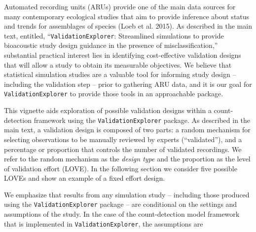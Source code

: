 \documentclass[
]{article}
\begin{document}
Automated recording units (ARUs) provide one of the main data sources for many contemporary ecological studies that aim to provide inference about status and trends for assemblages of species (Loeb et al. 2015). As described in the main text, entitled, ``\texttt{ValidationExplorer}: Streamlined simulations to provide bioacoustic study design guidance in the presence of misclassification,'' substantial practical interest lies in identifying cost-effective validation designs that will allow a study to obtain its measurable objectives. We believe that statistical simulation studies are a valuable tool for informing study design -- including the validation step -- prior to gathering ARU data, and it is our goal for \texttt{ValidationExplorer} to provide those tools in an approachable package.

This vignette aids exploration of possible validation designs within a count-detection framework using the \texttt{ValidationExplorer} package. As described in the main text, a validation design is composed of two parts: a random mechanism for selecting observations to be manually reviewed by experts (``validated''), and a percentage or proportion that controls the number of validated recordings. We refer to the random mechanism as the \emph{design type} and the proportion as the level of validation effort (LOVE). In the following section we consider five possible LOVEs and show an example of a fixed effort design.

We emphasize that results from any simulation study -- including those produced using the \texttt{ValidationExplorer} package -- are conditional on the settings and assumptions of the study. In the case of the count-detection model framework that is implemented in \texttt{ValidationExplorer}, the assumptions are
\end{document}
